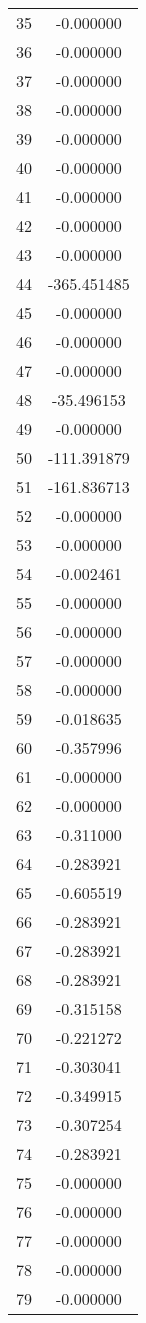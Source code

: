 \documentclass[12pt]{article}
\begin{document}
\begin{longtable}{@{}cc@{}}
35 & -0.000000 \\
36 & -0.000000 \\
37 & -0.000000 \\
38 & -0.000000 \\
39 & -0.000000 \\
40 & -0.000000 \\
41 & -0.000000 \\
42 & -0.000000 \\
43 & -0.000000 \\
44 & -365.451485 \\
45 & -0.000000 \\
46 & -0.000000 \\
47 & -0.000000 \\
48 & -35.496153 \\
49 & -0.000000 \\
50 & -111.391879 \\
51 & -161.836713 \\
52 & -0.000000 \\
53 & -0.000000 \\
54 & -0.002461 \\
55 & -0.000000 \\
56 & -0.000000 \\
57 & -0.000000 \\
58 & -0.000000 \\
59 & -0.018635 \\
60 & -0.357996 \\
61 & -0.000000 \\
62 & -0.000000 \\
63 & -0.311000 \\
64 & -0.283921 \\
65 & -0.605519 \\
66 & -0.283921 \\
67 & -0.283921 \\
68 & -0.283921 \\
69 & -0.315158 \\
70 & -0.221272 \\
71 & -0.303041 \\
72 & -0.349915 \\
73 & -0.307254 \\
74 & -0.283921 \\
75 & -0.000000 \\
76 & -0.000000 \\
77 & -0.000000 \\
78 & -0.000000 \\
79 & -0.000000 \\

\end{longtable}
\end{document}
